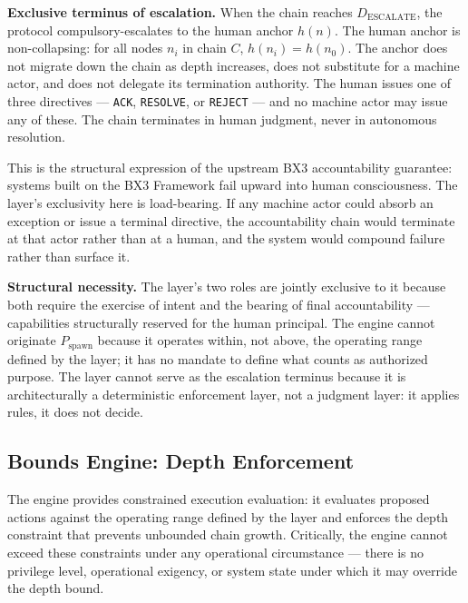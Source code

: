 \medskip
\noindent\textbf{Exclusive terminus of escalation.} When the chain reaches $D_{\mathrm{ESCALATE}}$, the protocol compulsory-escalates to the human anchor $h(n)$. The human anchor is non-collapsing: for all nodes $n_i$ in chain $C$, $h(n_i) = h(n_0)$. The anchor does not migrate down the chain as depth increases, does not substitute for a machine actor, and does not delegate its termination authority. The human issues one of three directives --- \texttt{ACK}, \texttt{RESOLVE}, or \texttt{REJECT} --- and no machine actor may issue any of these. The chain terminates in human judgment, never in autonomous resolution.

This is the structural expression of the upstream BX3 accountability guarantee: systems built on the BX3 Framework fail upward into human consciousness. The \purpose{} layer's exclusivity here is load-bearing. If any machine actor could absorb an exception or issue a terminal directive, the accountability chain would terminate at that actor rather than at a human, and the system would compound failure rather than surface it.

\medskip
\noindent\textbf{Structural necessity.} The \purpose{} layer's two roles are jointly exclusive to it because both require the exercise of intent and the bearing of final accountability --- capabilities structurally reserved for the human principal. The \bounds{} engine cannot originate $P_{\mathrm{spawn}}$ because it operates within, not above, the operating range defined by the \purpose{} layer; it has no mandate to define what counts as authorized purpose. The \fact{} layer cannot serve as the escalation terminus because it is architecturally a deterministic enforcement layer, not a judgment layer: it applies rules, it does not decide.

\subsection{Bounds Engine: Depth Enforcement}
\label{sec:rs-bounds-depth}

The \bounds{} engine provides constrained execution evaluation: it evaluates proposed actions against the operating range defined by the \purpose{} layer and enforces the depth constraint that prevents unbounded chain growth. Critically, the \bounds{} engine cannot exceed these constraints under any operational circumstance --- there is no privilege level, operational exigency, or system state under which it may override the depth bound.

